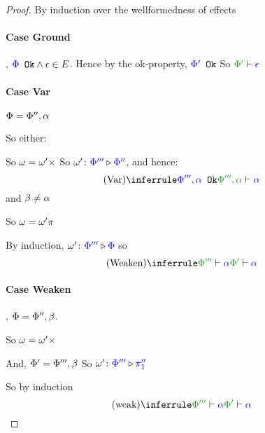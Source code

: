 \documentclass{report}
\begin{document}
\begin{framed}
        \begin{proof}
            
            By induction over the wellformedness of effects
            \paragraph{Case Ground}
            \bi, ${\color{blue} \Phi} \texttt{ Ok}\wedge\epsilon\in E$.
            Hence by the ok-property, ${\color{blue} \Phi'} \texttt{ Ok}$
            So $\wellformed{\P'}{\e}$
        
            \paragraph{Case Var}
        
            $\Phi = \Phi'', \alpha$
        
            So either:
        
                So $\omega = \omega'\times$
                So $\omega' \colon {\color{blue}\Phi'''} \triangleright {\color {blue} \Phi''}$, and hence:
                \begin{equation}
                    \ntreeruleI{Var}{\ok{\P''', \a}}{\wellformed{\P''',\a}{\a}}
                \end{equation}
             and $\beta \neq\alpha$
        
            So $\omega = \omega'\pi$
        
            By induction, $\omega' \colon {\color{blue}\Phi'''} \triangleright {\color {blue} \Phi}$
            so \begin{equation}
                \ntreeruleI{Weaken}{\wellformed{\P'''}{\a}}{\wellformed{\P'}{\a}}
            \end{equation}
        
            \paragraph{Case Weaken}
        
            \bi, $\Phi = \Phi'', \beta$.
        
            So $\omega = \omega'\times$
        
            And, $\Phi' = \Phi''', \beta$
            So \bi $\omega' \colon {\color{blue}\Phi'''} \triangleright {\color {blue} \pi_1''}$
        
            So by induction
            \begin{equation}
                \ntreeruleI{weak}{\wellformed{\P'''}{\a}}{\wellformed{\P'}{\a}}
            \end{equation}
        

\end{proof}
\end{framed}
\end{document}
